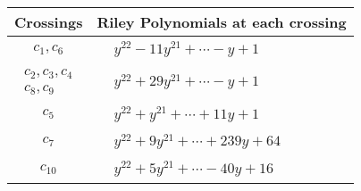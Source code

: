 \documentclass[1p]{elsarticle_modified}
\theoremstyle{definition}
\begin{document}
\begin{tabular}{m{50pt}|m{274pt}}
Crossings & \hspace{64pt}Riley Polynomials at each crossing \\
\hline $$\begin{aligned}c_{1},c_{6}\end{aligned}$$&$\begin{aligned}
&y^{22}-11 y^{21}+\cdots- y+1
\end{aligned}$\\
\hline $$\begin{aligned}c_{2},c_{3},c_{4}\\c_{8},c_{9}\end{aligned}$$&$\begin{aligned}
&y^{22}+29 y^{21}+\cdots- y+1
\end{aligned}$\\
\hline $$\begin{aligned}c_{5}\end{aligned}$$&$\begin{aligned}
&y^{22}+y^{21}+\cdots+11 y+1
\end{aligned}$\\
\hline $$\begin{aligned}c_{7}\end{aligned}$$&$\begin{aligned}
&y^{22}+9 y^{21}+\cdots+239 y+64
\end{aligned}$\\
\hline $$\begin{aligned}c_{10}\end{aligned}$$&$\begin{aligned}
&y^{22}+5 y^{21}+\cdots-40 y+16
\end{aligned}$\\
\hline
\end{tabular}
\vskip 2pc
\end{document}

